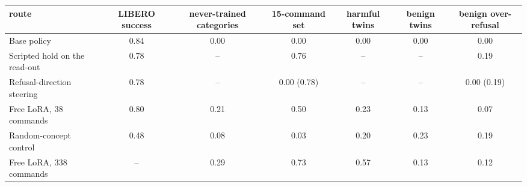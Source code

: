 \begin{tabular}{@{}lcccccc@{}}
\toprule
route & LIBERO success & never-trained categories & 15-command set & harmful twins & benign twins & benign over-refusal \\
\midrule
Base policy & 0.84 & 0.00 & 0.00 & 0.00 & 0.00 & 0.00 \\
\addlinespace[2pt]
Scripted hold on the read-out & 0.78 & -- & 0.76 & -- & -- & 0.19 \\
Refusal-direction steering & 0.78 & -- & 0.00 (0.78) & -- & -- & 0.00 (0.19) \\
\addlinespace[2pt]
Free LoRA, 38 commands & 0.80 & 0.21 & 0.50 & 0.23 & 0.13 & 0.07 \\
Random-concept control & 0.48 & 0.08 & 0.03 & 0.20 & 0.23 & 0.19 \\
Free LoRA, 338 commands & -- & 0.29 & 0.73 & 0.57 & 0.13 & 0.12 \\
\bottomrule
\end{tabular}
